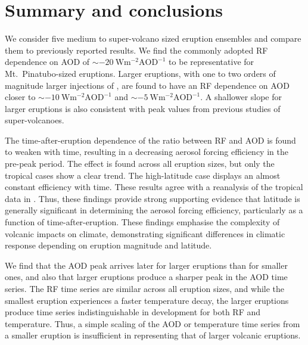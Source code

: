 \documentclass[draft]{agujournal2019}
\begin{document}
  \section{Summary and conclusions}

  \label{sec:conclusions}

  We consider five medium to super-volcano sized eruption ensembles and compare them to
  previously reported results. We find the commonly adopted RF dependence on AOD of
  \(\sim\SI{-20}{\watt\metre^{-2}\mathrm{AOD}^{-1}}\) to be representative for Mt.\
  Pinatubo-sized eruptions. Larger eruptions, with one to two orders of magnitude larger
  injections of \ce{SO2}, are found to have an RF dependence on AOD closer to
  \(\sim\SI{-10}{\watt\metre^{-2}\mathrm{AOD}^{-1}}\) and
  \(\sim\SI{-5}{\watt\metre^{-2}\mathrm{AOD}^{-1}}\). A shallower slope for larger
  eruptions is also consistent with peak values from previous studies of
  super-volcanoes.

  The time-after-eruption dependence of the ratio between RF and AOD is found to weaken
  with time, resulting in a decreasing aerosol forcing efficiency in the pre-peak
  period. The effect is found across all eruption sizes, but only the tropical cases
  show a clear trend. The high-latitude case displays an almost constant efficiency with
  time. These results agree with a reanalysis of the tropical data in
  \citeA{marshall2020dataset}. Thus, these findings provide strong supporting evidence
  that latitude is generally significant in determining the aerosol forcing efficiency,
  particularly as a function of time-after-eruption. These findings emphasise the
  complexity of volcanic impacts on climate, demonstrating significant differences in
  climatic response depending on eruption magnitude and latitude.

  We find that the AOD peak arrives later for larger eruptions than for smaller ones,
  and also that larger eruptions produce a sharper peak in the AOD time series. The RF
  time series are similar across all eruption sizes, and while the smallest eruption
  experiences a faster temperature decay, the larger eruptions produce time series
  indistinguishable in development for both RF and temperature. Thus, a simple scaling
  of the AOD or temperature time series from a smaller eruption is insufficient in
  representing that of larger volcanic eruptions.
\end{document}
